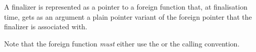 \begin{haddockdesc}
\item[\begin{tabular}{@{}l}
type FinalizerPtr a = FunPtr (Ptr a -> IO ())
\end{tabular}]
{\haddockbegindoc
A finalizer is represented as a pointer to a foreign function that, at
 finalisation time, gets as an argument a plain pointer variant of the
 foreign pointer that the finalizer is associated with.\par
Note that the foreign function \emph{must} either use the  or the  calling convention.\par}
\end{haddockdesc}
\begin{haddockdesc}
\item[\begin{tabular}{@{}l}
type FinalizerEnvPtr env a = FunPtr (Ptr env -> Ptr a -> IO ())
\end{tabular}]
\end{haddockdesc}
